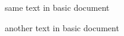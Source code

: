 \documentclass[12pt]{article}
\begin{document}
same text in basic document

{}

another text in basic document
\end{document}
